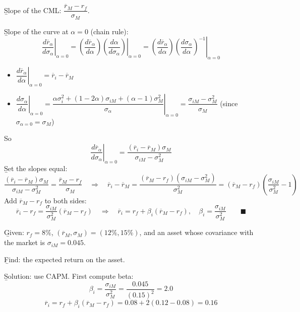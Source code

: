 \b{Slope of the CML}: $\dfrac{\overline{r}_M - r_f}{\sigma_M}$.

\b{Slope of the curve at $\alpha = 0$} (chain rule):
\[\left.\frac{d\overline{r}_\alpha}{d\sigma_\alpha}\right|_{\alpha=0} = \left.\left(\frac{d\overline{r}_\alpha}{d\alpha}\right)\left(\frac{d\alpha}{d\sigma_\alpha}\right)\right|_{\alpha=0} = \left.\left(\frac{d\overline{r}_\alpha}{d\alpha}\right)\left(\frac{d\sigma_\alpha}{d\alpha}\right)^{-1}\right|_{\alpha=0}\]
\begin{itemize}
    \item $\left.\dfrac{d\overline{r}_\alpha}{d\alpha}\right|_{\alpha=0} = \overline{r}_i - \overline{r}_M$
    \item $\left.\dfrac{d\sigma_\alpha}{d\alpha}\right|_{\alpha=0} = \left.\dfrac{\alpha\sigma_i^2 + (1-2\alpha)\sigma_{iM} + (\alpha-1)\sigma_M^2}{\sigma_\alpha}\right|_{\alpha=0} = \dfrac{\sigma_{iM} - \sigma_M^2}{\sigma_M}$ \quad (since $\sigma_{\alpha=0} = \sigma_M$)
\end{itemize}
So
\[\left.\frac{d\overline{r}_\alpha}{d\sigma_\alpha}\right|_{\alpha=0} = \frac{(\overline{r}_i - \overline{r}_M)\sigma_M}{\sigma_{iM} - \sigma_M^2}\]
\b{Set the slopes equal}:
\[\frac{(\overline{r}_i - \overline{r}_M)\sigma_M}{\sigma_{iM} - \sigma_M^2} = \frac{\overline{r}_M - r_f}{\sigma_M} \quad \Rightarrow \quad \overline{r}_i - \overline{r}_M = \frac{(\overline{r}_M - r_f)(\sigma_{iM} - \sigma_M^2)}{\sigma_M^2} = (\overline{r}_M - r_f)\left(\frac{\sigma_{iM}}{\sigma_M^2} - 1\right)\]
Add $\overline{r}_M - r_f$ to both sides:
\[\overline{r}_i - r_f = \frac{\sigma_{iM}}{\sigma_M^2}(\overline{r}_M - r_f) \quad \Rightarrow \quad \overline{r}_i = r_f + \beta_i(\overline{r}_M - r_f), \quad \beta_i = \frac{\sigma_{iM}}{\sigma_M^2} \qquad \blacksquare\]

\begin{example}
    \b{Given}: $r_f = 8\%$, $(\overline{r}_M, \sigma_M) = (12\%, 15\%)$, and an asset whose covariance with the market is $\sigma_{iM} = 0.045$.

    \b{Find}: the expected return on the asset.

    \b{Solution}: use CAPM. First compute beta:
    \[\beta_i = \frac{\sigma_{iM}}{\sigma_M^2} = \frac{0.045}{(0.15)^2} = 2.0\]
    \[\overline{r}_i = r_f + \beta_i(\overline{r}_M - r_f) = 0.08 + 2(0.12 - 0.08) = \boxed{0.16}\]
\end{example}

